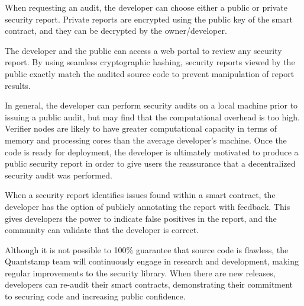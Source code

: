 \documentclass{llncs}
\begin{document}
When requesting an audit, the developer can choose either a public or private security report. Private reports are encrypted using the public key of the smart contract, and they can be decrypted by the owner/developer.

The developer and the public can access a web portal to review any security report. By using seamless cryptographic hashing, security reports viewed by the public exactly match the audited source code to prevent manipulation of report results. 

In general, the developer can perform security audits on a local machine prior to issuing a public audit, but may find that the computational overhead is too high. Verifier nodes are likely to have greater computational capacity in terms of memory and processing cores than the average developer's machine. Once the code is ready for deployment, the developer is ultimately motivated to produce a public security report in order to give users the reassurance that a decentralized security audit was performed.

When a security report identifies issues found within a smart contract, the developer has the option of publicly annotating the report with feedback. This gives developers the power to indicate false positives in the report, and the community can validate that the developer is correct.

Although it is not possible to 100\% guarantee that source code is flawless, the Quantstamp team will continuously engage in research and development, making regular improvements to the security library. When there are new releases, developers can re-audit their smart contracts, demonstrating their commitment to securing code and increasing public confidence.




\end{document}
